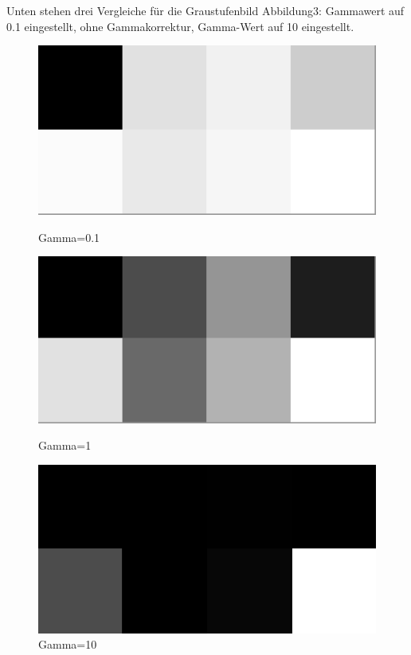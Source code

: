 \documentclass[course=erap]{aspdoc}
\begin{document}
\par
Unten stehen drei Vergleiche für die Graustufenbild Abbildung3: Gammawert auf 0.1 eingestellt, ohne Gammakorrektur, Gamma-Wert auf 10 eingestellt.
\begin{figure}[h]
\begin{minipage}{0.3\textwidth}
\centering
\includegraphics[width=\textwidth]{Bilder/gamma0.1.pgm.png}
\caption{Gamma=0.1}
\end{minipage}
\hfill
\begin{minipage}{0.3\textwidth}
\centering
\includegraphics[width=\textwidth]{Bilder/gamma1.pgm.png}
\caption{Gamma=1}
\end{minipage}
\hfill
\begin{minipage}{0.3\textwidth}
\centering
\includegraphics[width=\textwidth]{Bilder/gamma10.pgm.png}
\caption{Gamma=10}
\end{minipage}
\end{figure}
\end{document}
